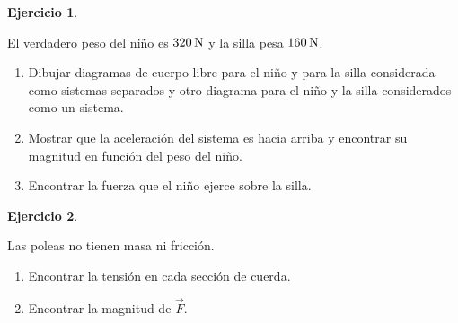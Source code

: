 \documentclass[a4paper,12pt,twoside]{book}
\newtheorem{ejercicio}{{Ejercicio}}[chapter]
\begin{document}
\begin{mdframed}[style=ejercicio-dificil]
    \begin{ejercicio}
    \end{ejercicio}
    El verdadero peso del niño es $320 \, \si{\newton}$ y la silla pesa $160 \, \si{\newton}$.
    \begin{center}
        \def\svgwidth{0.3\linewidth}
        
    \end{center}
    \begin{enumerate}
        \item Dibujar diagramas de cuerpo libre para el niño y para la silla considerada como sistemas separados y otro diagrama para el niño y la silla considerados como un sistema.
        \item Mostrar que la aceleración del sistema es hacia arriba y encontrar su magnitud en función del peso del niño.
        \item Encontrar la fuerza que el niño ejerce sobre la silla.
    \end{enumerate}
\end{mdframed}

\begin{mdframed}[style=ejercicio-dificil] %
    \begin{ejercicio}
    \end{ejercicio}
    Las poleas no tienen masa ni fricción.
    \begin{enumerate}
        \item Encontrar la tensión en cada sección de cuerda.
        \item Encontrar la magnitud de $\Vec{F}$.
    \end{enumerate}
\end{mdframed}
\end{document}
